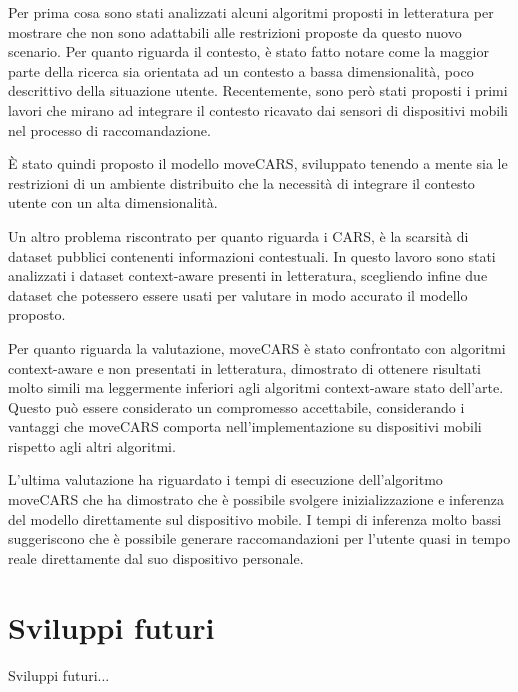 \documentclass[12pt,italian]{report}
\begin{document}
Per prima cosa sono stati analizzati alcuni algoritmi  proposti in letteratura per mostrare che non sono adattabili alle restrizioni proposte da questo nuovo scenario. Per quanto riguarda il contesto, è stato fatto notare come la maggior parte della ricerca sia orientata ad un contesto a bassa dimensionalità, poco descrittivo della situazione utente. Recentemente, sono però stati proposti i primi lavori che mirano ad integrare il contesto ricavato dai sensori di dispositivi mobili nel processo di raccomandazione. 

\`E stato quindi proposto il modello moveCARS, sviluppato tenendo a mente sia le restrizioni di un ambiente distribuito che la necessità di integrare il contesto utente con un alta dimensionalità.


Un altro problema riscontrato per quanto riguarda i CARS, è la scarsità di dataset pubblici contenenti informazioni contestuali. In questo lavoro sono stati analizzati i dataset context-aware presenti in letteratura, scegliendo infine due dataset che potessero essere usati per valutare in modo accurato il modello proposto.

Per quanto riguarda la valutazione, moveCARS è stato confrontato con algoritmi context-aware e non presentati in letteratura, dimostrato di ottenere risultati molto simili ma leggermente inferiori agli algoritmi context-aware stato dell'arte. Questo può essere considerato un compromesso accettabile, considerando i vantaggi che moveCARS comporta nell'implementazione su dispositivi mobili rispetto agli altri algoritmi.

L'ultima valutazione ha riguardato i tempi di esecuzione dell'algoritmo moveCARS che ha dimostrato che è possibile svolgere inizializzazione e inferenza del modello direttamente sul dispositivo mobile. I tempi di inferenza molto bassi suggeriscono che è possibile generare raccomandazioni per l'utente quasi in tempo reale direttamente dal suo dispositivo personale.



\section{Sviluppi futuri}

Sviluppi futuri...

%
%



\end{document}
